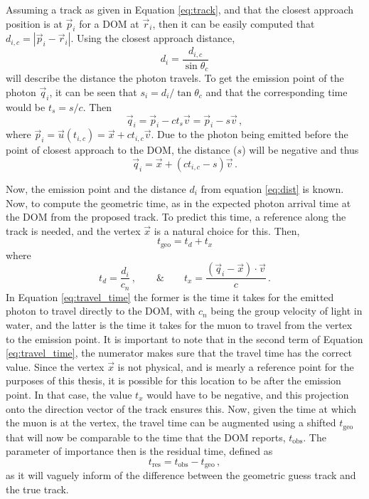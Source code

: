 Assuming a track as given in Equation \ref{eq:track}, and that the closest approach position is at $\vec{p}_{i}$ for a DOM at $\vec{r}_{i}$, then it can be easily computed that $d_{i,c} = |\vec{p}_{i} - \vec{r}_{i}|$. Using the closest approach distance,
\begin{equation}\label{eq:dist}
  d_{i} = \frac{d_{i,c}}{\sin\theta_{c}}
\end{equation}
will describe the distance the photon travels. To get the emission point of the photon $\vec{q}_{i}$, it can be seen that $s_{i} = d_{i}/\tan\theta_{c}$ and that the corresponding time would be $t_{s} = s/c$. Then
\begin{equation}
  \vec{q}_{i} = \vec{p}_{i} - ct_{s}\vec{v} = \vec{p}_{i} - s\vec{v}\, ,
\end{equation}
where $\vec{p}_{i} = \vec{u}(t_{i,c}) = \vec{x} + ct_{i,c}\vec{v}$. Due to the photon being emitted before the point of closest approach to the DOM, the distance ($s$) will be negative and thus
\begin{equation}\label{eq:emit}
  \vec{q}_{i} = \vec{x} + (ct_{i,c} - s)\vec{v}\, .
\end{equation}

Now, the emission point and the distance $d_{i}$ from equation \ref{eq:dist} is known. Now, to compute the geometric time, as in the expected photon arrival time at the DOM from the proposed track. To predict this time, a reference along the track is needed, and the vertex $\vec{x}$ is a natural choice for this. Then, 
\begin{equation}
  t_{\text{geo}} = t_{d} + t_{x}
\end{equation}
where
\begin{equation}\label{eq:travel_time}
  t_{d} = \frac{d_{i}}{c_{n}}\, , \hspace{2em} \& \hspace{2em} t_{x} = \frac{(\vec{q}_{i} - \vec{x})\cdot\vec{v}}{c}\, .
\end{equation}
In Equation \ref{eq:travel_time} the former is the time it takes for the emitted photon to travel directly to the DOM, with $c_{n}$ being the group velocity of light in water, and the latter is the time it takes for the muon to travel from the vertex to the emission point. It is important to note that in the second term of Equation \ref{eq:travel_time}, the numerator makes sure that the travel time has the correct value. Since the vertex $\vec{x}$ is not physical, and is mearly a reference point for the purposes of this thesis, it is possible for this location to be after the emission point. In that case, the value $t_{x}$ would have to be negative, and this projection onto the direction vector of the track ensures this. Now, given the time at which the muon is at the vertex, the travel time can be augmented using a shifted $t_{\text{geo}}$ that will now be comparable to the time that the DOM reports, $t_{\text{obs}}$. The parameter of importance then is the residual time, defined as
\begin{equation}
  t_{\text{res}} = t_{\text{obs}} - t_{\text{geo}}\, ,
\end{equation}
as it will vaguely inform of the difference between the geometric guess track and the true track. 

